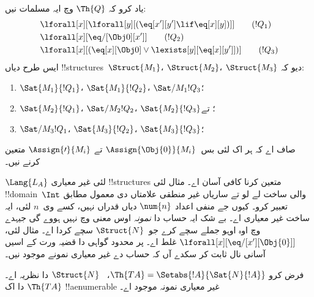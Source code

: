\documentclass[../../../include/open-logic-section]{subfiles}
\begin{document}
\begin{prob}
یاد کرو کہ $\Th{Q}$ وچ ایہ مسلمات نیں:
\begin{align*}
& \lforall[x][\lforall[y][(\eq[x'][y'] \lif \eq[x][y])]] \tag{$!Q_1$}\\
& \lforall[x][\eq/[\Obj 0][x']] \tag{$!Q_2$}\\
& \lforall[x][(\eq[x][\Obj 0] \lor \lexists[y][\eq[x][y']])] \tag{$!Q_3$}
\end{align*}
ایس طرح دیاں !!{structure}s~$\Struct{M_1}$،
$\Struct{M_2}$، $\Struct{M_3}$ دیو کہ:
\begin{enumerate}
\item $\Sat{M_1}{!Q_1}$، $\Sat{M_1}{!Q_2}$، $\Sat/{M_1}{!Q_3}$؛
\item $\Sat{M_2}{!Q_1}$، $\Sat/{M_2}{!Q_2}$، $\Sat{M_2}{!Q_3}$؛ تے
\item $\Sat/{M_3}{!Q_1}$، $\Sat{M_3}{!Q_2}$، $\Sat{M_3}{!Q_3}$؛
\end{enumerate}
صاف اے کہ ہر اک لئی بس~$\Assign{\Obj{0}}{M_i}$
تے $\Assign{\prime}{M_i}$ متعین کرنے نیں۔
\end{prob}

\begin{explain}
$\Lang{L_A}$ لئی غیر معیاری !!{structure}s
متعین کرنا کافی آسان اے۔ مثال لئی
!!{domain}~$\Int$ والی ساخت لے لو تے ساریاں
غیر منطقی علامتاں دی معمول مطابق تعبیر کرو۔
کیوں جے منفی اعداد $\num{n}$ دیاں قدراں
نہیں، کسے وی~$n$ لئی، ایہ ساخت غیر معیاری اے۔
بے شک ایہ حساب دا \emph{نمونہ} اوس معنی وچ نہیں
ہووے گی جیہدے وچ اوہ اوہو جملے سچے کرے
جو~$\Struct{N}$ سچے کردا اے۔ مثال لئی،
$\lforall[x][\eq/[x'][\Obj{0}]]$ غلط اے۔
پر محدود گواہی دا قضیہ ورت کے اسیں آسانی نال
ثابت کر سکدے آں کہ حساب دے غیر معیاری نمونے موجود نیں۔
\end{explain}

\begin{prop}
فرض کرو $\Th{TA} = \Setabs{!A}{\Sat{N}{!A}}$،
~$\Struct{N}$ دا نظریہ اے۔ $\Th{TA}$ دا اک
!!a{enumerable} غیر معیاری نمونہ موجود اے۔
\end{prop}
\end{document}
